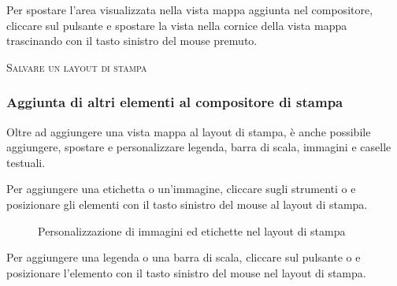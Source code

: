 Per spostare l'area visualizzata nella vista mappa aggiunta nel compositore,
cliccare sul pulsante  e spostare la vista nella cornice della vista mappa trascinando con
il tasto sinistro del mouse premuto.

\begin{Tip}\caption{\textsc{Salvare un layout di stampa}}
\end{Tip} 

\subsubsection{Aggiunta di altri elementi al compositore di stampa} 

Oltre ad aggiungere una vista mappa al layout di stampa, è anche possibile
aggiungere, spostare e personalizzare legenda, barra di scala, immagini e
caselle testuali.


Per aggiungere una etichetta o un'immagine, cliccare sugli strumenti
 o
 e posizionare gli
elementi con il tasto sinistro del mouse al layout di stampa.

\begin{figure}[ht]
\centering
\caption{Personalizzazione di immagini ed etichette nel layout di stampa \nixcaption}\label{fig:print_composer_tab2}
   \goodgap
\end{figure}


Per aggiungere una legenda o una barra di scala, cliccare sul pulsante
 o
 e posizionare
l'elemento con il tasto sinistro del mouse nel layout di stampa.


